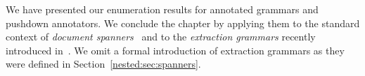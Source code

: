 %
%

%
%

We have presented our enumeration results for annotated grammars and
pushdown annotators. We conclude the chapter by applying them to the
standard context of \emph{document spanners}~\cite{FaginKRV15} and to the
\emph{extraction grammars} recently introduced in~\cite{Peterfreund21}. 
We omit a formal introduction of extraction grammars as they were defined in Section~\ref{nested:sec:spanners}.

%
%

